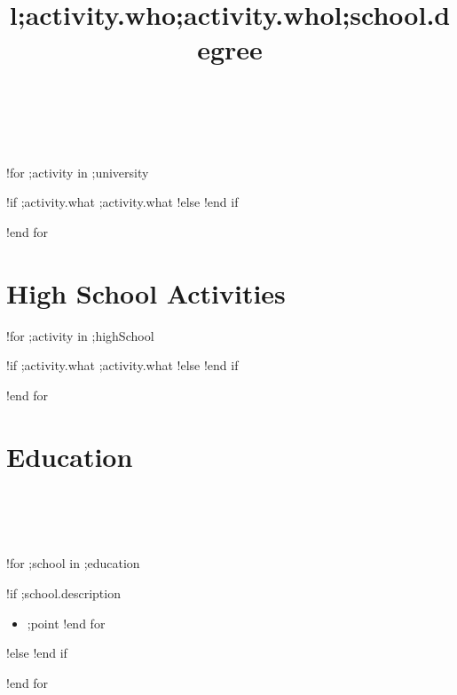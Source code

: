 \documentclass[margin,line]{res}
\begin{document}
\begin{sloppypar}
\begin{resume}
\begin{format}
  \title{l}\\
  \body\\
\end{format}

!for ;activity in ;university
    \title{\textbf{;activity.who}}
    \begin{position}
        !if ;activity.what
            ;activity.what
        !else
            \vspace{-0.5cm}
        !end if
    \end{position}
!end for


\section {High School Activities}

!for ;activity in ;highSchool
    \title{\textbf{;activity.who}}
    \begin{position}
        !if ;activity.what
            ;activity.what
        !else
            \vspace{-0.5cm}
        !end if
    \end{position}
!end for


\section{Education}

\begin{format}
  \title{l}\\
  \\
  \body\\
\end{format}

!for ;school in ;education
    \title{\textbf{;school.degree}}
    \begin{position}
        \vspace{-.3cm}
        !if ;school.description
            \begin{itemize}
            !for ;point in ;school.description
                \item ;point
            !end for
            \end{itemize}
        !else
            \vspace{-.2cm}
        !end if
    \end{position}
!end for



\end{resume}
\end{sloppypar}
\end{document}

